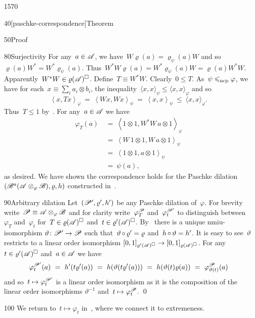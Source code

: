 \begin{parsec}{1570}
\begin{point}{40}[paschke-correspondence]{Theorem}
\begin{point}{50}{Proof}
\begin{point}{80}{Surjectivity}
For any~$a\in\mathscr{A}$, we have~$W \varrho(a) = \varrho_\psi(a) W$
and so~$\varrho(a) W^* = W^* \varrho_\psi(a)$.
Thus~$W^*W \varrho(a) = W^* \varrho_\psi(a) W = \varrho(a) W^*W$.
Apparently~$W^*W \in \varrho(\mathscr{A})^\square$.
Define~$T \equiv W^*W$. Clearly~$0\leq T$.
As~$\psi \mathrel{\leqslant_{\mathrm{ncp}}} \varphi$,
    we have for each~$x \equiv \sum_i a_i \otimes b_i$,
    the inequality~$\langle x,x\rangle_\psi \leq \langle x,x\rangle_\varphi$
    and so
\begin{equation*}
    \left<x, Tx\right>_\varphi \ =\  \left<Wx,Wx\right>_\psi
    \ =\  \left<x,x\right>_\psi \ \leq\  \langle x,x \rangle_\varphi.
\end{equation*}
    Thus~$T \leq 1$ by~.
For any~$a\in \mathscr{A}$ we have
\begin{align*}
    \varphi_T(a) &\ =\  \left<1\otimes 1, W^*W\, a \otimes 1\right>_\varphi \\
    &  \ =\  \left<W\, 1\otimes 1, W\, a\otimes1\right>_\psi \\
    &  \ = \ \left<1\otimes1, a\otimes1\right>_\psi \\
    &  \ = \ \psi(a),
\end{align*}
    as desired.  We have shown the correspondence holds for
    the Paschke dilation~$(\mathscr{B}^a(\mathscr{A} \otimes_\varphi \mathscr{B}), \varrho, h)$
                constructed in~.
\end{point}
\begin{point}{90}{Arbitrary dilation}%
Let~$(\mathscr{P}', \varrho', h')$ be any Paschke dilation
    of~$\varphi$.
For brevity write~$\mathscr{P} \equiv \mathscr{A} \otimes_\varphi \mathscr{B}$
    and for clarity
    write~$\varphi_T^{\mathscr{P}}$
        and~$\varphi_t^{\mathscr{P}'}$
    to distinguish between~$\varphi_T$ and~$\varphi_t$
    for~$T \in \varrho(\mathscr{A})^\square$ and~$t \in \varrho'(\mathscr{A})^\square$.
By~
    there is a unique nmiu-isomorphism
    $\vartheta\colon \mathscr{P}' \to \mathscr{P}$
    such that~$\vartheta \mathop{\circ} \varrho' = \varrho $
    and~$h \mathop{\circ} \vartheta = h'$.
It is easy to see~$\vartheta$ restricts to a linear order isomorphism
    $[0,1]_{\varrho'(\mathscr{A})^\square} \to [0,1]_{\varrho(\mathscr{A})^\square}$.
For any~$t \in \varrho'(\mathscr{A})^\square$ and~$a\in \mathscr{A}$ we have
\begin{equation*}
    \varphi_t^{\mathscr{P}'} (a)
        \ = \ h'(t \varrho'(a))
        \ = \ h(\vartheta(t \varrho'(a)))
        \ = \ h(\vartheta(t) \varrho(a))
        \ = \ \varphi_{\vartheta(t)}^{\mathscr{P}}(a)
\end{equation*}
and so~$t \mapsto \varphi_t^{\mathscr{P}'}$
    is a linear order isomorphism as it
    is the composition of the linear order isomorphisms
    $\vartheta^{-1}$ and~$t \mapsto \varphi_t^{\mathscr{P}}$. \qed
\end{point}
\begin{point}{100}%
We return to~$t \mapsto \varphi_t$
    in~,
    where we connect it to extremeness.
\end{point}
\end{point}
\end{point}
\end{parsec}
